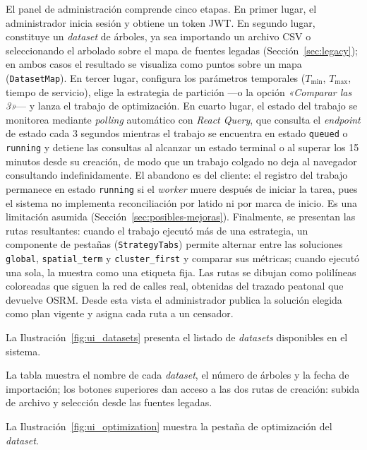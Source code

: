 El panel de administración comprende cinco etapas. En primer lugar, el administrador
inicia sesión y obtiene un token JWT. En segundo lugar, constituye un
\textit{dataset} de árboles, ya sea importando un archivo CSV o seleccionando el
arbolado sobre el mapa de fuentes legadas (Sección~\ref{sec:legacy}); en ambos casos
el resultado se visualiza como puntos sobre un mapa (\texttt{DatasetMap}). En tercer
lugar, configura los parámetros temporales ($T_{\min}$, $T_{\max}$, tiempo de
servicio), elige la estrategia de partición ---o la opción \textit{«Comparar las
3»}--- y lanza el trabajo de optimización. En
cuarto lugar, el estado del trabajo se monitorea mediante \textit{polling} automático
con \textit{React Query}, que consulta el \textit{endpoint} de estado cada 3 segundos mientras el
trabajo se encuentra en estado \texttt{queued} o \texttt{running} y detiene las
consultas al alcanzar un estado terminal o al superar los 15 minutos desde su
creación, de modo que un trabajo colgado no deja al navegador consultando
indefinidamente. El abandono es del cliente: el registro del trabajo permanece en
estado \texttt{running} si el \textit{worker} muere después de iniciar la tarea,
pues el sistema no implementa reconciliación por latido ni por marca de inicio. Es
una limitación asumida (Sección~\ref{sec:posibles-mejoras}). Finalmente, se presentan las rutas resultantes: cuando el trabajo
ejecutó más de una estrategia, un componente de pestañas (\texttt{StrategyTabs})
permite alternar entre las soluciones \texttt{global}, \texttt{spatial\_term} y
\texttt{cluster\_first} y comparar sus métricas; cuando ejecutó una sola, la muestra
como una etiqueta fija. Las rutas se dibujan como polilíneas coloreadas que siguen la
red de calles real, obtenidas del trazado peatonal que devuelve OSRM. Desde esta vista
el administrador publica la solución elegida como plan vigente y asigna cada ruta a un
censador.

La Ilustración~\ref{fig:ui_datasets} presenta el listado de \textit{datasets} disponibles en el sistema.


La tabla muestra el nombre de cada \textit{dataset}, el número de árboles y la fecha de importación; los botones superiores dan acceso a las dos rutas de creación: subida de archivo y selección desde las fuentes legadas.

La Ilustración~\ref{fig:ui_optimization} muestra la pestaña de optimización del \textit{dataset}.

